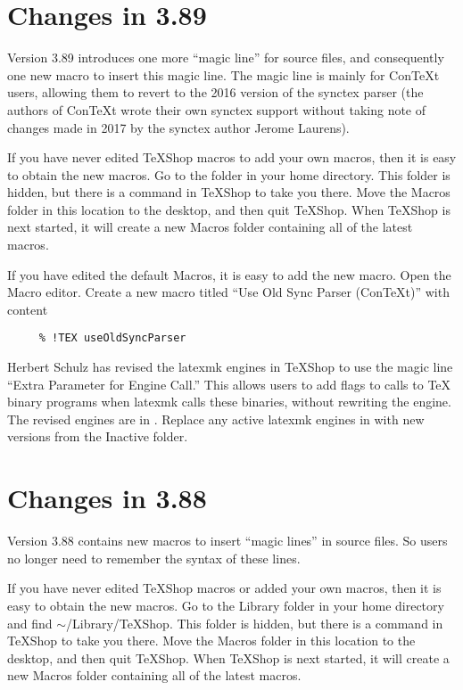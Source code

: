 \documentclass[11pt, oneside]{amsart}
\begin{document}
\section{Changes in 3.89}

Version 3.89 introduces one more ``magic line'' for source files, and consequently one new macro to insert this magic line. The magic line is mainly for ConTeXt users, allowing them to revert to the 2016 version of the synctex parser (the authors of ConTeXt wrote their own synctex support without taking note of changes made in 2017 by the synctex author Jerome Laurens). 

If you have never edited TeXShop macros to add your own macros, then it is easy to obtain the new macros.
Go to the  folder  in your home directory. This folder is hidden, but there is a command in TeXShop to take you there. Move the Macros folder in this location to the desktop,
and then quit TeXShop. When TeXShop is next started, it will create a new Macros folder containing all of the latest macros.

If you have edited the default Macros, it is easy to add the new macro. Open the Macro editor. Create a new macro titled ``Use Old Sync Parser (ConTeXt)'' with content
\begin{verbatim}
     % !TEX useOldSyncParser
\end{verbatim}

Herbert Schulz has revised the latexmk engines in TeXShop to use the magic line ``Extra Parameter for Engine Call.'' This allows users to add  flags to calls to TeX binary programs when latexmk calls these binaries, without rewriting the engine. The revised engines are in . Replace any active latexmk engines in
 with new versions from the Inactive folder.

\section{Changes in 3.88}

Version 3.88 contains new macros to insert ``magic lines'' in source files. So users no longer need to remember the syntax of these lines.

If you have never edited TeXShop macros or added your own macros, then it is easy to obtain the new macros.
Go to the Library folder in your home directory and find $\sim$/Library/TeXShop. This folder is hidden, but there is a command in TeXShop to take you there. Move the Macros folder in this location to the desktop,
and then quit TeXShop. When TeXShop is next started, it will create a new Macros folder containing all of the latest macros.
\end{document}
